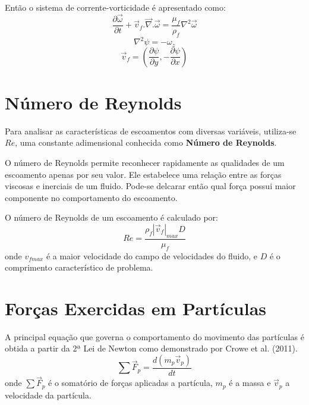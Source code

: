 Então o sistema de corrente-vorticidade é apresentado como:
\begin{equation}
	\dfrac{\partial \vec{\omega}}{\partial t} +
	\vec{v}_f.\vec{\nabla}.\vec{\omega} =
    \dfrac{\mu_f}{\rho_f} \nabla^2 \vec{\omega}
    \label{fluid_eq1}
\end{equation}
\begin{equation}
	\nabla^2\psi =
	-\omega_z
    \label{fluid_eq2}
\end{equation}
\begin{equation}
	\vec{v}_f = \left(\dfrac{\partial \psi}{\partial y},
	-\dfrac{\partial \psi}{\partial x} \right)
    \label{fluid_eq3}
\end{equation}


\section{\textbf{Número de Reynolds}}
\label{sec_reynolds}
Para analisar as características de escoamentos com diversas variáveis, utiliza-se $Re$, uma constante adimensional conhecida como \textbf{Número de Reynolds}.

O número de Reynolds permite reconhecer rapidamente as qualidades de um escoamento apenas por seu valor.
Ele estabelece uma relação entre as forças viscosas e inerciais de um fluido.
Pode-se delcarar então qual força possui maior componente no comportamento do escoamento.

O número de Reynolds de um escoamento é calculado por:
\begin{equation}
    Re = \dfrac{\rho_f |\vec{v}_{f}|_{max} D}{\mu_f} 
    \label{reynolds}
\end{equation}
onde $v_{fmax}$ é a maior velocidade do campo de velocidades do fluido, e $D$ é o comprimento característico de problema.


\section{\textbf{Forças Exercidas em Partículas}}
\label{sec_eq_part}
A principal equação que governa o comportamento do movimento das partículas é obtida a partir da 2ª Lei de Newton como demonstrado por Crowe et al. (2011)\cite{crowe}.
\begin{equation}
    \sum\vec{F}_{p} = \dfrac{d(m_p\vec{v}_p)}{dt}
    \label{newton} 
\end{equation}
onde $\sum\vec{F}_{p}$ é o somatório de forças aplicadas a partícula, $m_p$ é a massa e $\vec{v}_p$ a velocidade da partícula.


